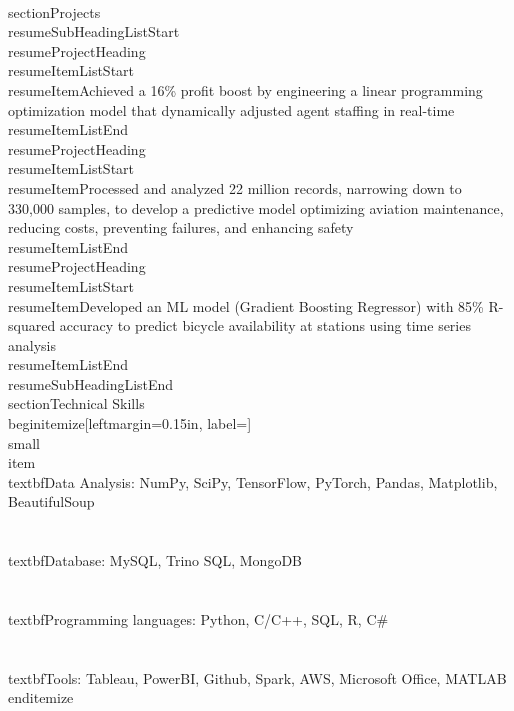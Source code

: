 \documentclass[letterpaper,11pt]{article}
\makeatletter
\newcommand{\resumeItem}[1]{
  \item\small{
    {#1 \vspace{-2pt}}
  }
}
\newcommand{\resumeProjectHeading}[2]{
    \item
    \begin{tabular*}{0.97\textwidth}{l@{\extracolsep{\fill}}r}
      \small#1 & #2 \\
    \end{tabular*}\vspace{-7pt}
}
\newcommand{\resumeSubHeadingListStart}{\begin{itemize}[leftmargin=0.15in, label={}]}
\newcommand{\resumeSubHeadingListEnd}{\end{itemize}}
\newcommand{\resumeItemListStart}{\begin{itemize}}
\newcommand{\resumeItemListEnd}{\end{itemize}\vspace{-5pt}}
\makeatother
\begin{document}
\\section{Projects}\n    \\resumeSubHeadingListStart\n      \\resumeProjectHeading{}\n          \\resumeItemListStart\n            \\resumeItem{Achieved a 16\% profit boost by engineering a linear programming optimization model that dynamically adjusted agent staffing in real-time}\n          \\resumeItemListEnd\n      \\resumeProjectHeading{}\n          \\resumeItemListStart\n            \\resumeItem{Processed and analyzed 22 million records, narrowing down to 330,000 samples, to develop a predictive model optimizing aviation maintenance, reducing costs, preventing failures, and enhancing safety}\n          \\resumeItemListEnd\n      \\resumeProjectHeading{}\n          \\resumeItemListStart\n            \\resumeItem{Developed an ML model (Gradient Boosting Regressor) with 85\% R-squared accuracy to predict bicycle availability at stations using time series analysis}\n          \\resumeItemListEnd\n    \\resumeSubHeadingListEnd\n
\\section{Technical Skills}\n \\begin{itemize}[leftmargin=0.15in, label={}]\n    \\small{\\item{\n     \\textbf{Data Analysis}{: NumPy, SciPy, TensorFlow, PyTorch, Pandas, Matplotlib, BeautifulSoup} \\\\      \\textbf{Database}{: MySQL, Trino SQL, MongoDB} \\\\      \\textbf{Programming languages}{: Python, C/C++, SQL, R, C\#} \\\\      \\textbf{Tools}{: Tableau, PowerBI, Github, Spark, AWS, Microsoft Office, MATLAB}\n    }}\n \\end{itemize}\n
\end{document}
